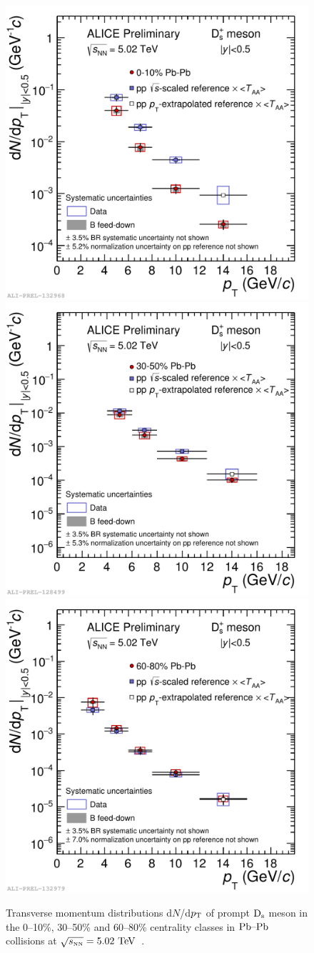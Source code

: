 \begin{figure}[!t]
 \begin{center}
\includegraphics[width=.49\textwidth]{FigCap5/Ds_dNdpt_010.pdf}
\includegraphics[width=.49\textwidth]{FigCap5/Ds_dNdpt_3050.pdf}
\includegraphics[width=.49\textwidth]{FigCap5/Ds_dNdpt_6080.pdf}
 \end{center}
 \caption{Transverse momentum distributions d$N$/d$p_{\rm T}$ of 
prompt ${\rm D_s}$ meson in the 0--10\%, 30--50\% and 60--80\% 
centrality classes in $\mbox{Pb--Pb}$ collisions 
at $\sqrt{s_{\rm \scriptscriptstyle NN}}=5.02~\mathrm{TeV}$~\cite{ALICE-PUBLIC-2017-003}. }
 \label{fig:DmesCorrYields010} 
\end{figure} 



